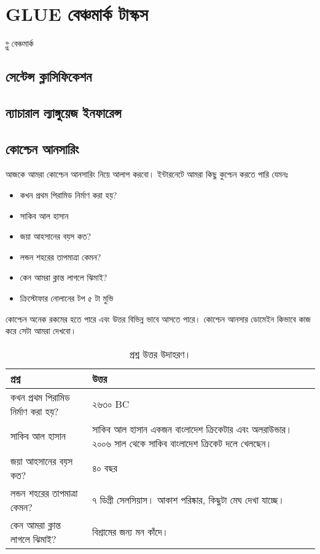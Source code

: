 \chapter{GLUE বেঞ্চমার্ক টাস্কস}
গ্লু বেঞ্চমার্ক \cite{wang-etal-2018-glue}

\section{সেন্টেন্স ক্লাসিফিকেশন}
\section{ন্যাচারাল ল্যাঙ্গুয়েজ  ইনফারেন্স}
\section{কোশ্চেন আনসারিং}

আজকে আমরা কোশ্চেন আনসারিং নিয়ে আলাপ করবো। ইন্টারনেটে আমরা কিছু কুশ্চেন করতে পারি যেমনঃ

\begin{itemize}
	\item কখন প্রথম পিরামিড নির্মাণ করা হয়? 
	\item সাকিব আল হাসান
	\item জয়া আহসানের বয়স কত? 
	\item লন্ডন শহরের তাপমাত্রা কেমন?
	\item কেন আমরা ক্লান্ত লাগলে ঝিমাই?
	\item ক্রিস্টোফার নোলানের টপ ৫ টা মুভি 
\end{itemize}

কোশ্চেন অনেক রকমের হতে পারে এবং উত্তর বিভিন্ন ভাবে আসতে পারে। কোশ্চেন আনসার ডোমেইন কিভাবে কাজ করে সেটা আমরা দেখবো। 

\begin{table}[!ht]
\begin{tabular}{  p{15em}  p{10cm}|} 
  \toprule
  প্রশ্ন & উত্তর \\
  \bottomrule
  কখন প্রথম পিরামিড নির্মাণ করা হয়?  & ২৬৩০ BC \\ 
  \hline
  সাকিব আল হাসান & সাকিব আল হাসান একজন বাংলাদেশ ক্রিকেটার এবং অলরাউন্ডার। ২০০৬ সাল থেকে সাকিব বাংলাদেশ ক্রিকেট দলে খেলছেন। \\ 
  \hline
  জয়া আহসানের বয়স কত?  & ৪০ বছর  \\ 
  \hline
  লন্ডন শহরের তাপমাত্রা কেমন? & ৭ ডিগ্রী সেলসিয়াস। আকাশ পরিষ্কার, কিছুটা মেঘ দেখা যাচ্ছে।  \\ 
  \hline
  কেন আমরা ক্লান্ত লাগলে ঝিমাই? & বিশ্রামের জন্য মন কাঁদে।  \\ 
  \bottomrule
\end{tabular}
\caption{প্রশ্ন উত্তর উদাহরণ।}
\end{table}


